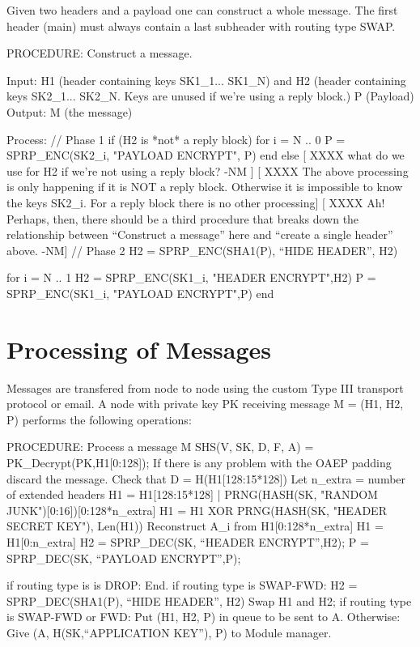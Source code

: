 Given two headers and a payload one can construct a whole
message. The first header (main) must always contain a last subheader
with routing type SWAP.  

PROCEDURE: Construct a message.

Input: H1 (header containing keys SK1_1... SK1_N)
       and H2 (header containing keys SK2_1... SK2_N.  Keys are unused
            if we're using a reply block.)
       P (Payload)
Output: M (the message)

Process:
	// Phase 1
	if (H2 is *not* a reply block)
		for i = N .. 0
	            P = SPRP_ENC(SK2_i, "PAYLOAD ENCRYPT", P)
		end
        else
           [ XXXX what do we use for H2 if we're not using a reply
	           block? -NM ]
	   [ XXXX The above processing is only happening if it is NOT
	a reply block. Otherwise it is impossible to know the keys
	SK2_i. For a reply block there is no other processing]
           [ XXXX Ah!  Perhaps, then, there should be a third
	          procedure that breaks down the relationship between
                  ``Construct a message'' here and ``create a single header''
                  above. -NM]
	// Phase 2
	H2 = SPRP_ENC(SHA1(P), ``HIDE HEADER'', H2)

	for i = N .. 1
		H2 = SPRP_ENC(SK1_i, "HEADER ENCRYPT",H2)
		P = SPRP_ENC(SK1_i, "PAYLOAD ENCRYPT",P)
	end

\section{Processing of Messages}

Messages are transfered from node to node using the custom Type III
transport protocol or email.  A node with private key PK receiving
message M = (H1, H2, P) performs the following operations:

PROCEDURE: Process a message M
	SHS(V, SK, D, F, A) = PK_Decrypt(PK,H1[0:128]);
        If there is any problem with the OAEP padding discard the message.
        Check that D = H(H1[128:15*128])
        Let n_extra = number of extended headers
        H1 = H1[128:15*128] | PRNG(HASH(SK, "RANDOM 
                                               JUNK")[0:16])[0:128*n_extra]
	H1 = H1 XOR PRNG(HASH(SK, "HEADER SECRET KEY"), Len(H1))
        Reconstruct A_i from H1[0:128*n_extra]
        H1 = H1[0:n_extra]
	H2 = SPRP_DEC(SK, ``HEADER ENCRYPT'',H2);
	P = SPRP_DEC(SK, ``PAYLOAD ENCRYPT'',P);

	if routing type is is DROP:
                End.
	if routing type is SWAP-FWD:
		H2 = SPRP_DEC(SHA1(P), ``HIDE HEADER'', H2)
		Swap H1 and H2;
        if routing type is SWAP-FWD or FWD:
	   	Put (H1, H2, P) in queue to be sent to A.
        Otherwise:
		Give (A, H(SK,``APPLICATION KEY''), P) to
		Module manager. 

